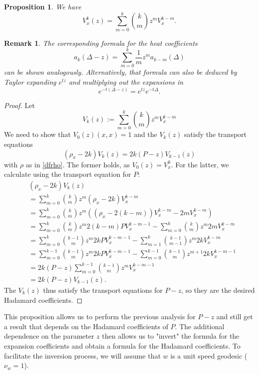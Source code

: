 \documentclass[11pt]{article}
\newtheorem{prop}[df]{Proposition}
\newtheorem{rem}[df]{Remark}
\begin{document}
\begin{prop}
	\label{Vz}
	We have
	\[V^{k}_{x}(z)=\sum\limits_{m=0}^k\binom{k}{m}z^mV^{k-m}_x.\]
\end{prop}
\begin{rem}
	The corresponding formula for the heat coefficients
	\[a_k(\Delta-z)=\sum\limits_{m=0}^k\frac{1}{m}z^ma_{k-m}(\Delta)\]
	can be shown analogously. Alternatively, that formula can also be deduced by Taylor expanding $e^{tz}$ and multiplying out the expansions in 
	\[e^{-t(\Delta-z)}=e^{tz}e^{-t\Delta}.\]
\end{rem}
\begin{proof}
	Let
	\[V_k(z):=\sum\limits_{m=0}^k\binom{k}{m}z^mV^{k-m}_x\]
	We need to show that $V_0(z)(x,x)=1$ and the $V_k(z)$ satisfy the transport equations
	\[(\rho_x-2k)V_k(z)=2k(P-z)V_{k-1}(z)\]
	with $\rho$ as in \ref{dfrho}.
	The former holds, as $V_0(z)=V^0_x$. For the latter, we calculate using the transport equation for $P$:
	\begin{align*}
		&(\rho_x-2k)V_k(z)\\
		&=\sum\limits_{m=0}^k\binom{k}{m}z^m(\rho_x-2k)V^{k-m}_x\\
		&=\sum\limits_{m=0}^k\binom{k}{m}z^m((\rho_x-2(k-m))V^{k-m}_x-2mV^{k-m}_x)\\
		&=\sum\limits_{m=0}^k\binom{k}{m}z^m2(k-m)PV^{k-m-1}_x-\sum\limits_{m=0}^k\binom{k}{m}z^m2mV^{k-m}_x\\
		&=\sum\limits_{m=0}^k\binom{k-1}{m}z^m2kPV^{k-m-1}_x-\sum\limits_{m=1}^k\binom{k-1}{m-1}z^m2kV^{k-m}_x\\
		&=\sum\limits_{m=0}^{k-1}\binom{k-1}{m}z^m2kPV^{k-m-1}_x-\sum\limits_{m=0}^{k-1}\binom{k-1}{m}z^{m+1}2kV^{k-m-1}_x\\
		&=2k(P-z)\sum\limits_{m=0}^{k-1}\binom{k-1}{m}z^mV^{k-m-1}_x\\
		&=2k(P-z)V_{k-1}(z).
	\end{align*}
	The $V_k(z)$ thus satisfy the transport equations for $P-z$, so they are the desired Hadamard coefficients.
\end{proof}
This proposition allows us to perform the previous analysis for $P-z$ and still get a result that depends on the Hadamard coefficients of $P$. The additional dependence on the parameter $z$ then allows us to "invert" the formula for the expansion coefficients and obtain a formula for the Hadamard coefficients. To facilitate the inversion process, we will assume that $w$ is a unit speed geodesic ($\nu_w=1$).
\end{document}
